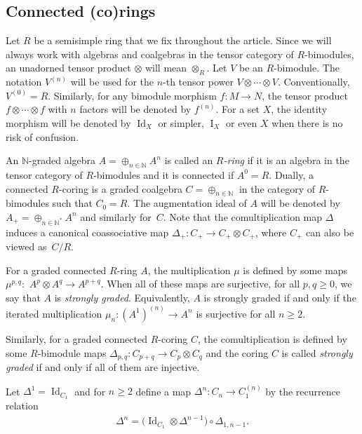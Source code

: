 \documentclass[11pt]{article}
\newcommand\ot{\otimes}
\newcommand\op{\oplus}
\newcommand\bb{\mathbb}
\renewcommand{\^}[1]{\mbox{$^{\left( #1 \right)}$}}
\renewcommand{\_}[1]{\mbox{$_{\left( #1 \right)}$}}
\numberwithin{equation}{section}
\begin{document}
\subsection{Connected (co)rings} \label{corings} Let $R$ be a semisimple ring that we f\/ix throughout the article. Since we will always work with algebras and coalgebras in the tensor category of $R$-bimodules, an unadorned tensor product $\ot$ will mean $\ot_R$. Let $V$ be an $R$-bimodule. The notation $V^{(n)}$ will be used for the $n$-th tensor power $V \ot \cdots \ot V$. Conventionally, $V^{(0)} = R$. Similarly, for any bimodule morphism $f\colon M \to N$, the tensor product $f \ot \cdots \ot f$ with $n$ factors will be denoted by $f^{(n)}$. For a set $X$, the identity morphism will be denoted by $\operatorname{Id}_X$ or simpler, $\operatorname{I}_X$ or even $X$ when there is no risk of confusion.

An $\bb{N}$-graded algebra $A = \op_{n \in \bb{N}} A^n$ is called an \emph{$R$-ring} if it is an algebra in the tensor category of $R$-bimodules and it is connected if $A^0=R$. Dually, a connected $R$-coring is a graded coalgebra $C = \op_{n \in \bb{N}}$ in the category of $R$-bimodules such that $C_0=R$. The augmentation ideal of $A$ will be denoted by $A_+ = \op_{n \in \bb{N}^\ast} A^n$ and similarly for~$C$. Note that the comultiplication map $\Delta$ induces a canonical coassociative map $\Delta_+ \colon C_+ \to C_+ \ot C_+$, where $C_+$ can also be viewed as~$C/R$.

For a graded connected $R$-ring $A$, the multiplication $\mu$ is def\/ined by some maps $\mu^{p,q} \colon$ \mbox{$A^p \ot A^q \to A^{p+q}$}. When all of these maps are surjective, for all $p,q \geq 0$, we say that $A$ is \emph{strongly graded}. Equivalently, $A$ is strongly graded if and only if the iterated multiplication $\mu_n \colon (A^1)^{(n)} \to A^n$ is surjective for all $n \geq 2$.

Similarly, for a graded connected $R$-coring $C$, the comultiplication is def\/ined by some $R$-bimodule maps $\Delta_{p,q} \colon C_{p+q} \to C_p \ot C_q$ and the coring $C$ is called \emph{strongly graded} if and only if all of them are injective.

Let $\Delta^1 = \operatorname{Id}_{C_1}$ and for $n \geq 2$ def\/ine a map $\Delta^n\colon C_n \to C_1^{(n)}$ by the recurrence relation
\begin{gather*}
	\Delta^n = \big(\operatorname{Id}_{C_1} \ot \Delta^{n-1}\big) \circ \Delta_{1,n-1}.
\end{gather*}
\end{document}
